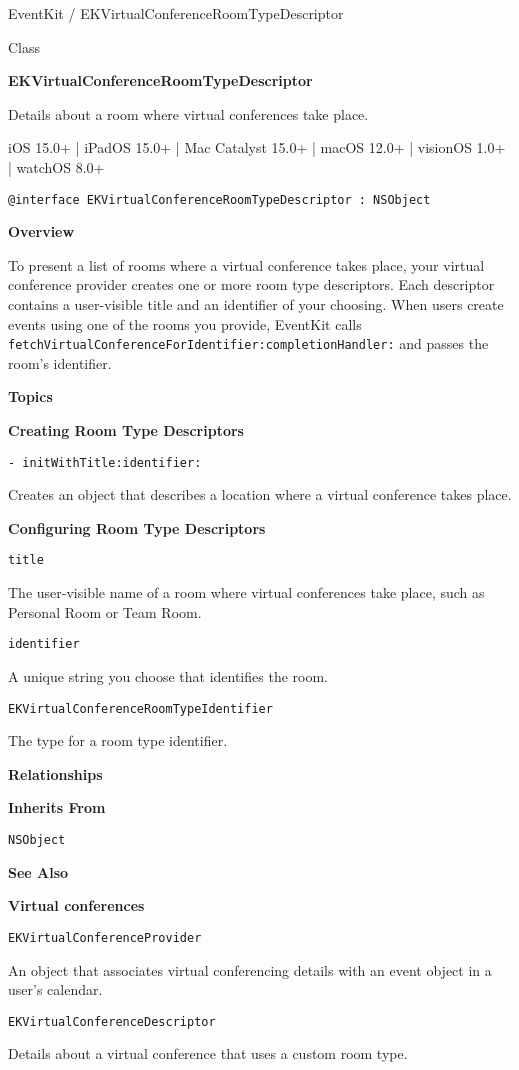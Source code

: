 \documentclass{article}
\title{}
\author{}
\date{}
\begin{document}
EventKit / EKVirtualConferenceRoomTypeDescriptor

Class

\textbf{EKVirtualConferenceRoomTypeDescriptor}

Details about a room where virtual conferences take place.

iOS 15.0+ | iPadOS 15.0+ | Mac Catalyst 15.0+ | macOS 12.0+ | visionOS 1.0+ | watchOS 8.0+

\texttt{@interface EKVirtualConferenceRoomTypeDescriptor : NSObject}

\textbf{Overview}

To present a list of rooms where a virtual conference takes place, your virtual conference provider creates one or more room type descriptors. Each descriptor contains a user-visible title and an identifier of your choosing. When users create events using one of the rooms you provide, EventKit calls \texttt{fetchVirtualConferenceForIdentifier:completionHandler:} and passes the room's identifier.

\textbf{Topics}

\textbf{Creating Room Type Descriptors}

\texttt{- initWithTitle:identifier:}

Creates an object that describes a location where a virtual conference takes place.

\textbf{Configuring Room Type Descriptors}

\texttt{title}

The user-visible name of a room where virtual conferences take place, such as Personal Room or Team Room.

\texttt{identifier}

A unique string you choose that identifies the room.

\texttt{EKVirtualConferenceRoomTypeIdentifier}

The type for a room type identifier.

\textbf{Relationships}

\textbf{Inherits From}

\texttt{NSObject}

\textbf{See Also}

\textbf{Virtual conferences}

\texttt{EKVirtualConferenceProvider}

An object that associates virtual conferencing details with an event object in a user's calendar.

\texttt{EKVirtualConferenceDescriptor}

Details about a virtual conference that uses a custom room type.

\newpage
\end{document}
